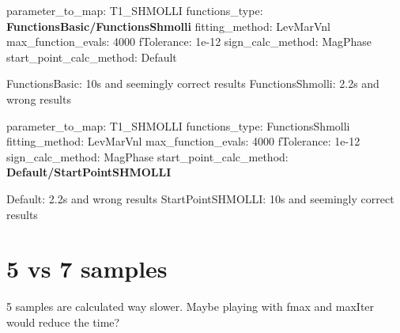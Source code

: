 parameter\-\_\-to\-\_\-map\-: T1\-\_\-\-S\-H\-M\-O\-L\-L\-I functions\-\_\-type\-: {\bfseries Functions\-Basic/\-Functions\-Shmolli} fitting\-\_\-method\-: Lev\-Mar\-Vnl max\-\_\-function\-\_\-evals\-: 4000 f\-Tolerance\-: 1e-\/12 sign\-\_\-calc\-\_\-method\-: Mag\-Phase start\-\_\-point\-\_\-calc\-\_\-method\-: Default

Functions\-Basic\-: 10s and seemingly correct results Functions\-Shmolli\-: 2.\-2s and wrong results

parameter\-\_\-to\-\_\-map\-: T1\-\_\-\-S\-H\-M\-O\-L\-L\-I functions\-\_\-type\-: Functions\-Shmolli fitting\-\_\-method\-: Lev\-Mar\-Vnl max\-\_\-function\-\_\-evals\-: 4000 f\-Tolerance\-: 1e-\/12 sign\-\_\-calc\-\_\-method\-: Mag\-Phase start\-\_\-point\-\_\-calc\-\_\-method\-: {\bfseries Default/\-Start\-Point\-S\-H\-M\-O\-L\-L\-I}

Default\-: 2.\-2s and wrong results Start\-Point\-S\-H\-M\-O\-L\-L\-I\-: 10s and seemingly correct results

\section*{5 vs 7 samples}

5 samples are calculated way slower. Maybe playing with fmax and max\-Iter would reduce the time? 